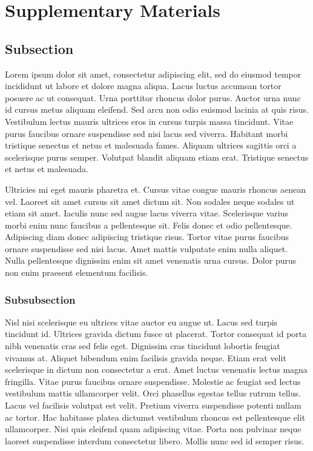 \onecolumn
\setcounter{secnumdepth}{3}	%
\setcounter{page}{1}
\renewcommand{\thesubsection}{\Alph{subsection}}
\renewcommand{\thesubsubsection}{\thesubsection.\arabic{subsubsection}}

\section*{Supplementary Materials}




\subsection{Subsection}\label{sec:supp-section}

Lorem ipsum dolor sit amet, consectetur adipiscing elit, sed do eiusmod tempor incididunt ut labore et dolore magna aliqua. Lacus luctus accumsan tortor posuere ac ut consequat. Urna porttitor rhoncus dolor purus. Auctor urna nunc id cursus metus aliquam eleifend. Sed arcu non odio euismod lacinia at quis risus. Vestibulum lectus mauris ultrices eros in cursus turpis massa tincidunt. Vitae purus faucibus ornare suspendisse sed nisi lacus sed viverra. Habitant morbi tristique senectus et netus et malesuada fames. Aliquam ultrices sagittis orci a scelerisque purus semper. Volutpat blandit aliquam etiam erat. Tristique senectus et netus et malesuada.

Ultricies mi eget mauris pharetra et. Cursus vitae congue mauris rhoncus aenean vel. Laoreet sit amet cursus sit amet dictum sit. Non sodales neque sodales ut etiam sit amet. Iaculis nunc sed augue lacus viverra vitae. Scelerisque varius morbi enim nunc faucibus a pellentesque sit. Felis donec et odio pellentesque. Adipiscing diam donec adipiscing tristique risus. Tortor vitae purus faucibus ornare suspendisse sed nisi lacus. Amet mattis vulputate enim nulla aliquet. Nulla pellentesque dignissim enim sit amet venenatis urna cursus. Dolor purus non enim praesent elementum facilisis.


\subsubsection{Subsubsection}
Nisl nisi scelerisque eu ultrices vitae auctor eu augue ut. Lacus sed turpis tincidunt id. Ultrices gravida dictum fusce ut placerat. Tortor consequat id porta nibh venenatis cras sed felis eget. Dignissim cras tincidunt lobortis feugiat vivamus at. Aliquet bibendum enim facilisis gravida neque. Etiam erat velit scelerisque in dictum non consectetur a erat. Amet luctus venenatis lectus magna fringilla. Vitae purus faucibus ornare suspendisse. Molestie ac feugiat sed lectus vestibulum mattis ullamcorper velit. Orci phasellus egestas tellus rutrum tellus. Lacus vel facilisis volutpat est velit. Pretium viverra suspendisse potenti nullam ac tortor. Hac habitasse platea dictumst vestibulum rhoncus est pellentesque elit ullamcorper. Nisi quis eleifend quam adipiscing vitae. Porta non pulvinar neque laoreet suspendisse interdum consectetur libero. Mollis nunc sed id semper risus.

